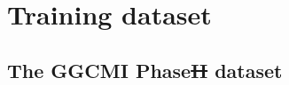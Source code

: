 \documentclass[gmdd]{copernicus} %
\providecommand{\DIFadd}[1]{{\protect\color{blue}\uwave{#1}}} %
\providecommand{\DIFdel}[1]{{\protect\color{red}\sout{#1}}}                      %
\providecommand{\DIFaddbegin}{} %
\providecommand{\DIFaddend}{} %
\providecommand{\DIFdelbegin}{} %
\providecommand{\DIFdelend}{} %
\begin{document}
 \DIFaddbegin 

\DIFaddend %
\section{Training dataset}
\label{S:2}
\subsection{The GGCMI Phase\DIFdelbegin \DIFdel{II }\DIFdelend \DIFaddbegin \DIFadd{~2 }\DIFaddend dataset}
\DIFdelbegin %
\DIFdelend \DIFaddbegin \label{S:2a}
\end{document}
